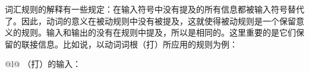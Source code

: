 \noindent
词汇规则的解释有一些规定：在输入符号中没有提及的所有信息都被输入符号替代了。因此，动词的意义在被动规则中没有被提及，这就使得被动规则是一个保留意义的规则。输入和输出的\contvsc 没有在规则中提及，所以是相同的。这里重要的是它们保留的联接信息。比如说，以动词词根（打）所应用的规则为例：
\eal
\label{lr-passiv-beispiel}
\ex 
\begin{tabular}[t]{@{}l@{}}
（打）的输入：\\
\end{tabular}
\ex 
